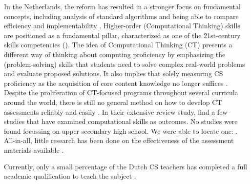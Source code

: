 In the Netherlands, the reform has resulted in a stronger focus on fundamental concepts, including analysis of standard algorithms and being able to compare efficiency and implementability \cite{Barendsen2016}. Higher-order (Computational Thinking) skills are positioned as a fundamental pillar, characterized as one of the 21st-century skills competencies (\cite{SLO2015}). The idea of Computational Thinking (CT) presents a different way of thinking about computing proficiency by emphasizing the (problem-solving) skills that students need to solve complex real-world problems and evaluate proposed solutions. It also implies that solely measuring CS proficiency as the acquisition of core content knowledge no longer suffices \cite{Yadav2015}. Despite the proliferation of CT-focused programs throughout several curricula around the world, there is still no general method on how to develop CT assessments reliably and easily \cite{catete2017framework}. In their extensive review study,  find a few studies that have examined computational skills as outcomes. No studies were found focussing on upper secondary high school. We were able to locate one: . All-in-all, little research has been done on the effectiveness of the assessment materials available \cite{Yadav2016}.




Currently, only a small percentage of the Dutch CS teachers has completed a full academic qualification to teach the subject \cite{tolboom2014informatica}.

